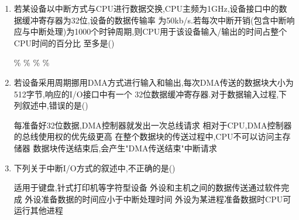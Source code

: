 \documentclass[12pt, a4paper, oneside, UTF8]{ctexbook}
\begin{document}
\begin{enumerate}
    \item \bl 若某设备以中断方式与CPU进行数据交换,CPU主频为1GHz,设备接口中的数据缓冲寄存器为32位,设备的数据传输率
    为50kb/s.若每次中断开销(包含中断响应与中断处理)为1000个时钟周期,则CPU用于该设备输入/输出的时间占整个CPU时间的百分比
    至多是() 
    \begin{choices}
        \% \% \% \% 
    \end{choices}

    \item \bl 若设备采用周期挪用DMA方式进行输入和输出,每次DMA传送的数据块大小为512字节,响应的I/O接口中有一个
    32位数据缓冲寄存器.对于数据输入过程,下列叙述中,错误的是() 
    \begin{choices}[1]
        \task 每准备好32位数据,DMA控制器就发出一次总线请求 
        \task 相对于CPU,DMA控制器的总线使用权的优先级更高 
        \task 在整个数据块的传送过程中,CPU不可以访问主存储器
        \task 数据块传送结束后,会产生"DMA传送结束"中断请求
    \end{choices}

    \item \bl 下列关于中断I/O方式的叙述中,不正确的是() 
    \begin{choices}[1]
        \task 适用于键盘,针式打印机等字符型设备 
        \task 外设和主机之间的数据传送通过软件完成
        \task 外设准备数据的时间应小于中断处理时间 
        \task 外设为某进程准备数据时CPU可运行其他进程
    \end{choices}
\end{enumerate}

\newpage 
\end{document}

